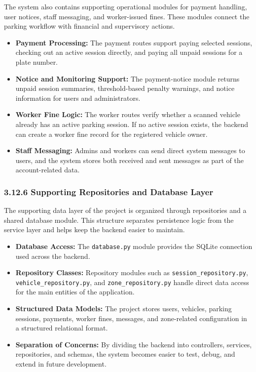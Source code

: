 \documentclass[12pt,a4paper,oneside]{report}
\begin{document}
The system also contains supporting operational modules for payment handling, user notices, staff messaging, and worker-issued fines. These modules connect the parking workflow with financial and supervisory actions.

\begin{itemize}[leftmargin=2em]
    \item \textbf{Payment Processing:} The payment routes support paying selected sessions, checking out an active session directly, and paying all unpaid sessions for a plate number.

    \item \textbf{Notice and Monitoring Support:} The payment-notice module returns unpaid session summaries, threshold-based penalty warnings, and notice information for users and administrators.

    \item \textbf{Worker Fine Logic:} The worker routes verify whether a scanned vehicle already has an active parking session. If no active session exists, the backend can create a worker fine record for the registered vehicle owner.

    \item \textbf{Staff Messaging:} Admins and workers can send direct system messages to users, and the system stores both received and sent messages as part of the account-related data.
\end{itemize}

\subsubsection*{3.12.6 Supporting Repositories and Database Layer}

The supporting data layer of the project is organized through repositories and a shared database module. This structure separates persistence logic from the service layer and helps keep the backend easier to maintain.

\begin{itemize}[leftmargin=2em]
    \item \textbf{Database Access:} The \texttt{database.py} module provides the SQLite connection used across the backend.

    \item \textbf{Repository Classes:} Repository modules such as \texttt{session\_\allowbreak repository.py}, \texttt{vehicle\_\allowbreak repository.py}, and \texttt{zone\_\allowbreak repository.py} handle direct data access for the main entities of the application.

    \item \textbf{Structured Data Models:} The project stores users, vehicles, parking sessions, payments, worker fines, messages, and zone-related configuration in a structured relational format.

    \item \textbf{Separation of Concerns:} By dividing the backend into controllers, services, repositories, and schemas, the system becomes easier to test, debug, and extend in future development.
\end{itemize}
\end{document}

